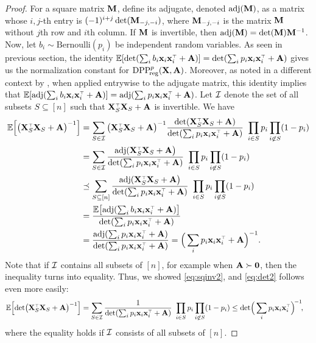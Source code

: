 \documentclass[11pt]{article}
\begin{document}
\begin{proof}
For a square matrix $\mathbf M$, define its adjugate, denoted $\operatorname{\textnormal{adj}}(\mathbf M)$, as a matrix
whose $i,j$-th entry is $(-1)^{i+j}\det(\mathbf M_{-j,-i})$, where
$\mathbf M_{-j,-i}$ is the matrix $\mathbf M$ without $j$th row and $i$th column. If
$\mathbf M$ is invertible, then $\operatorname{\textnormal{adj}}(\mathbf M) = \det(\mathbf M)\mathbf M^{-1}$. Now, let
$b_i\sim\mathrm{Bernoulli}(p_i)$ be independent random variables. As seen
in previous section, the identity
$\E[\det(\sum_ib_i\x_i\x_i^\top+\A)]=\det(\sum_ip_i\x_i\x_i^\top+\A)$ gives
us the normalization constant for ${{\mathrm{DPP}}_{\!\mathrm{reg}}^{p}}(\mathbf X,\mathbf A)$. Moreover, as
noted in a different context by \cite{determinantal-averaging}, when
applied entrywise to the adjugate matrix, this identity implies that
$\E[\adj(\sum_ib_i\x_i\x_i^\top+\A)]=\adj(\sum_ip_i\x_i\x_i^\top+\A)$. Let
$\mathcal I$ denote the set of all subsets $S\subseteq [n]$ such that
$\X_S^\top\X_S+\A$ is invertible. We have
\begin{align*}
  \E\Big[\big(\X_S^\top\X_S+\A\big)^{-1}\Big]
  &= \sum_{S\in\Ic}\big(\X_S^\top\X_S+\A\big)^{-1}
\frac{\det(\X_S^\top\X_S+\A)}{\det(\sum_ip_i\x_i\x_i^\top+\A)}\ \prod_{i\in
    S}p_i\prod_{i\not\in S}(1-p_i)
\\ &=\sum_{S\in\Ic}\frac{\adj(\X_S^\top\X_S+\A\big)}
{\det(\sum_ip_i\x_i\x_i^\top+\A)}\ \prod_{i\in
     S}p_i\prod_{i\not\in S}(1-p_i)
\\ &\preceq \sum_{S\subseteq[n]}\frac{\adj(\X_S^\top\X_S+\A\big)}
{\det(\sum_ip_i\x_i\x_i^\top+\A)}\ \prod_{i\in
     S}p_i\prod_{i\not\in S}(1-p_i)
\\ &=\frac{\E\big[\!\adj(\sum_i
     b_i\x_i\x_i^\top+\A)\big]}{\det(\sum_ip_i\x_i\x_i^\top+\A)}
  \\
  &=\frac{\adj(\sum_ip_i\x_i\x_i^\top+\A)}{\det(\sum_ip_i\x_i\x_i^\top+\A)}
    = \Big(\sum_ip_i\x_i\x_i^\top+\A\Big)^{-1}.
\end{align*}
Note that if $\mathcal I$ contains all subsets of $[n]$, for example when
$\mathbf A\succ\mathbf 0$, then the inequality turns into equality. Thus, we
showed \eqref{eq:sqinv2}, and \eqref{eq:det2} follows even more easily:
\begin{align*}
  \E\Big[\!\det\!\big(\X_S^\top\X_S+\A\big)^{-1}\Big]
  &= \sum_{S\in\Ic}
\frac{1}{\det(\sum_ip_i\x_i\x_i^\top+\A)}\ \prod_{i\in
    S}p_i\prod_{i\not\in S}(1-p_i)
\leq \det\!\Big(\sum_i p_i\x_i\x_i^\top\Big)^{\!-1}\!,
\end{align*}
where the equality holds if $\mathcal I$ consists of all subsets of $[n]$.
\end{proof}
\end{document}
